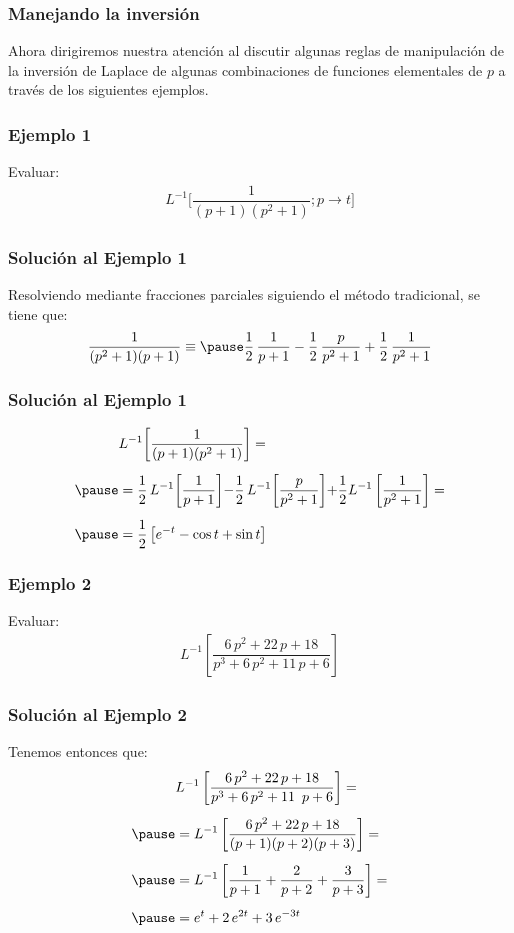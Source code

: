 \begin{frame}
\frametitle{Manejando la inversión}
Ahora dirigiremos nuestra atención al discutir algunas reglas de manipulación de la inversión de Laplace de algunas combinaciones de funciones elementales de $p$ a través de los siguientes ejemplos.
\end{frame}
\begin{frame}
\frametitle{Ejemplo 1}
Evaluar:
\pause
\begin{align*}
L^{-1} \bigg[ \dfrac{1}{(p + 1)(p^{2} + 1)} ; p \to t \bigg]
\end{align*}
\end{frame}
\begin{frame}
\frametitle{Solución al Ejemplo 1}
Resolviendo mediante fracciones parciales siguiendo el método tradicional, se tiene que:
\pause
\begin{eqnarray*}
\begin{aligned}
\dfrac{1}{(p^{2} + 1)(p + 1)} \equiv \pause \dfrac{1}{2} \, \dfrac{1}{p + 1} - \dfrac{1}{2} \, \dfrac{p}{p^{2} + 1} + \dfrac{1}{2} \, \dfrac{1}{p^{2} + 1}
\end{aligned}
\end{eqnarray*}
\end{frame}
\begin{frame}
\frametitle{Solución al Ejemplo 1}
\begin{eqnarray*}
\begin{aligned}
&L^{-1} \bigg[ \dfrac{1}{(p + 1)(p^{2} + 1)} \bigg] = \\[0.5em] \pause
&= \dfrac{1}{2} \, L^{-1} \bigg[ \dfrac{1}{p + 1}\bigg] {-} \dfrac{1}{2} \, L^{-1} \bigg[\dfrac{p}{p^{2} + 1} \bigg] {+} \dfrac{1}{2} L^{-1} \, \bigg[\dfrac{1}{p^{2} + 1} \bigg] = \\[0.5em] \pause
&= \dfrac{1}{2} \, \big[  e^{-t} - \cos t + \sin t  \big]
\end{aligned}
\end{eqnarray*}
\end{frame}
\begin{frame}
\frametitle{Ejemplo 2}
Evaluar:
\pause
\begin{align*}
L^{-1} \left[ \dfrac{6 \, p^{2} + 22 \, p + 18}{p^{3} + 6 \, p^{2} + 11 \, p + 6} \right]
\end{align*}
\end{frame}
\begin{frame}
\frametitle{Solución al Ejemplo 2}
Tenemos entonces que:
\pause
\begin{eqnarray*}
\begin{aligned}
&L^{-1} \left[ \dfrac{6 \, p^{2} + 22 \, p + 18}{p^{3} + 6 \, p^{2} + 11 \, p + 6} \right] = \\[0.5em] \pause
&= L^{-1} \left[ \dfrac{6 \, p^{2} + 22 \, p + 18}{(p + 1)(p + 2)(p + 3)} \right] = \\[0.5em] \pause
&= L^{-1} \left[ \dfrac{1}{p + 1} + \dfrac{2}{p + 2} + \dfrac{3}{p + 3} \right] = \\[0.5em] \pause
&= e^{t} + 2 \, e^{2 t} + 3 \, e^{- 3 t}
\end{aligned}
\end{eqnarray*}
\end{frame}

